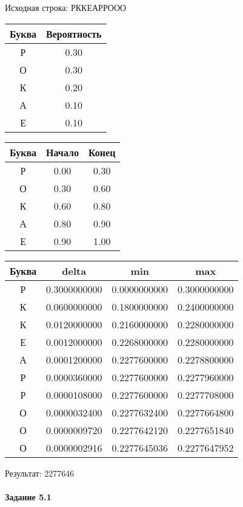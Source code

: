 \documentclass[a4paper, 12pt]{article}
\begin{document}
Исходная строка: РККЕАРРООО\
\begin{center}
 \begin{tabular}{ |c|c| } 
  \hline
     Буква & Вероятность \\ \hline
Р & 0.30\\\hline
О & 0.30\\\hline
К & 0.20\\\hline
А & 0.10\\\hline
Е & 0.10
\\ \hline \end{tabular}
\end{center}
\begin{center}
 \begin{tabular}{ |c|c|c| } 
  \hline
     Буква & Начало & Конец \\ \hline
Р & 0.00 & 0.30\\\hline
О & 0.30 & 0.60\\\hline
К & 0.60 & 0.80\\\hline
А & 0.80 & 0.90\\\hline
Е & 0.90 & 1.00
\\ \hline \end{tabular}
\end{center}
\begin{center}
 \begin{tabular}{ |c|c|c|c| } 
  \hline
     Буква & delta & min & max \\ \hline
Р & 0.3000000000 & 0.0000000000 & 0.3000000000\\\hline
К & 0.0600000000 & 0.1800000000 & 0.2400000000\\\hline
К & 0.0120000000 & 0.2160000000 & 0.2280000000\\\hline
Е & 0.0012000000 & 0.2268000000 & 0.2280000000\\\hline
А & 0.0001200000 & 0.2277600000 & 0.2278800000\\\hline
Р & 0.0000360000 & 0.2277600000 & 0.2277960000\\\hline
Р & 0.0000108000 & 0.2277600000 & 0.2277708000\\\hline
О & 0.0000032400 & 0.2277632400 & 0.2277664800\\\hline
О & 0.0000009720 & 0.2277642120 & 0.2277651840\\\hline
О & 0.0000002916 & 0.2277645036 & 0.2277647952
\\ \hline \end{tabular}
\end{center}
Результат: 2277646
\pagebreak
\paragraph{Задание 5.1 \\
}
\end{document}
